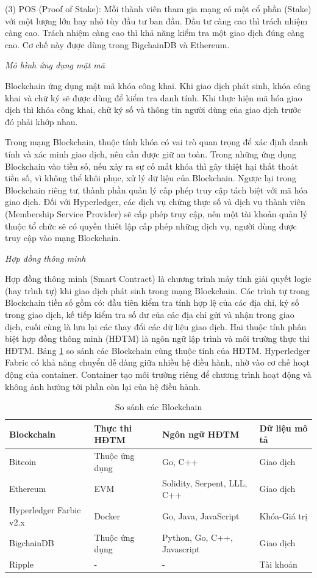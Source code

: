 (3) POS (Proof of Stake): Mỗi thành viên tham gia mạng có một cổ phần (Stake) với một lượng lớn hay nhỏ tùy đầu tư ban đầu. 
Đầu tư càng cao thì trách nhiệm càng cao. 
Trách nhiệm càng cao thì khả năng kiểm tra một giao dịch đúng càng cao. Cơ chế này được dùng trong BigchainDB và Ethereum. 

\emph{Mô hình ứng dụng mật mã}

Blockchain ứng dụng mật mã khóa công khai. 
Khi giao dịch phát sinh, khóa công khai và chữ ký sẽ được dùng để kiểm tra danh tính.
Khi thực hiện mã hóa giao dịch thì khóa công khai, chữ ký số và thông tin người dùng của giao dịch trước đó phải khớp nhau.

Trong mạng Blockchain, thuộc tính khóa có vai trò quan trọng để xác định danh tính và xác minh giao dịch, nên cần được giữ an toàn. 
Trong những ứng dụng Blockchain vào tiền số, nếu xảy ra sự cố mất khóa thì gây thiệt hại thất thoát tiền số, vì không thể khôi phục, xử lý dữ liệu của Blockchain.
Ngược lại trong Blockchain riêng tư, thành phần quản lý cấp phép truy cập tách biệt với mã hóa giao dịch. 
Đối với Hyperledger, các dịch vụ chứng thực số và dịch vụ thành viên (Membership Service Provider) sẽ cấp phép truy cập, nên một tài khoản quản lý thuộc tổ chức sẽ có quyền thiết lập cấp phép những dịch vụ, người dùng được truy cập vào mạng Blockchain.

\emph{Hợp đồng thông minh}

Hợp đồng thông minh (Smart Contract) là chương trình máy tính giải quyết logic (hay trình tự) khi giao dịch phát sinh trong mạng Blockchain. 
Các trình tự trong Blockchain tiền số gồm có: đầu tiên kiểm tra tính hợp lệ của các địa chỉ, ký số trong giao dịch, kế tiếp kiểm tra số dư của các địa chỉ gửi và nhận trong giao dịch, cuối cùng là lưu lại các thay đổi các dữ liệu giao dịch. 
Hai thuộc tính phân biệt hợp đồng thông minh (HĐTM) là ngôn ngữ lập trình và môi trường thực thi HĐTM. Bảng \ref{table:ssblockchain} so sánh các Blockchain cùng thuộc tính của HĐTM. 
Hyperledger Fabric có khả năng chuyển dễ dàng giữa nhiều hệ điều hành, nhờ vào cơ chế hoạt động của container.
Container tạo môi trường riêng để chương trình hoạt động và không ảnh hưởng tới phần còn lại của hệ điều hành.

\begin{table}[H]
\caption{So sánh các Blockchain}
	\label{table:ssblockchain}
	\begin{tabularx} {\textwidth} {|X|X|X|p{2.5cm}|}
\hline
	Blockchain & Thực thi HĐTM & Ngôn ngữ HĐTM  & Dữ liệu mô tả \\ \hline
	Bitcoin  & Thuộc ứng dụng & Go, C++ & Giao dịch\\ \hline
	Ethereum  & EVM & Solidity, Serpent, LLL, C++ & Giao dịch\\ \hline
	Hyperledger Farbic v2.x  & Docker & Go, Java, JavaScript & Khóa-Giá trị\\ \hline
	BigchainDB   & Thuộc ứng dụng  &  Python, Go, C++, Javascript  & Giao dịch\\ \hline
	Ripple   & -  & - & Tài khoản \\ \hline
\end{tabularx}
\end{table}

